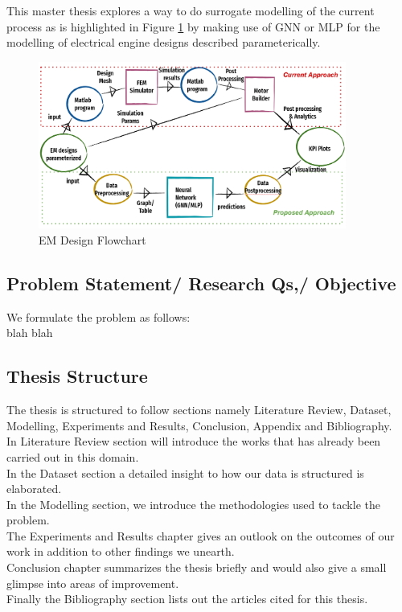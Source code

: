 \documentclass{report} %
\begin{document}
This master thesis explores a way to do surrogate modelling of the current process as is highlighted in Figure \ref{fig:EM Design Flowchart} by making use of \ac{GNN} or \ac{MLP} for the modelling of electrical engine designs described parameterically. \\
\begin{figure}[H]
    \centering
    \includegraphics[width=0.9\textwidth]{./ReportImages/EM_design_flowchart_v2.png} 
    \caption{EM Design Flowchart}
    \label{fig:EM Design Flowchart}
\end{figure}

\subsection*{Problem Statement/ Research Qs,/ Objective}
We formulate the problem as follows: \\ blah blah


\subsection*{Thesis Structure}

The thesis is structured to follow sections namely Literature Review, Dataset, Modelling, Experiments and Results, Conclusion, Appendix and Bibliography.\\
In Literature Review section will introduce the works that has already been carried out in this domain. \\
In the Dataset section a detailed insight to how our data is structured is elaborated.\\
In the Modelling section, we introduce the methodologies used to tackle the problem. \\
The Experiments and Results chapter gives an outlook on the outcomes of our work in addition to other findings we unearth.\\ 
Conclusion chapter summarizes the thesis briefly and would also give a small glimpse into areas of improvement. \\
Finally the Bibliography section lists out the articles cited for this thesis.\\
\newpage 
\end{document}
